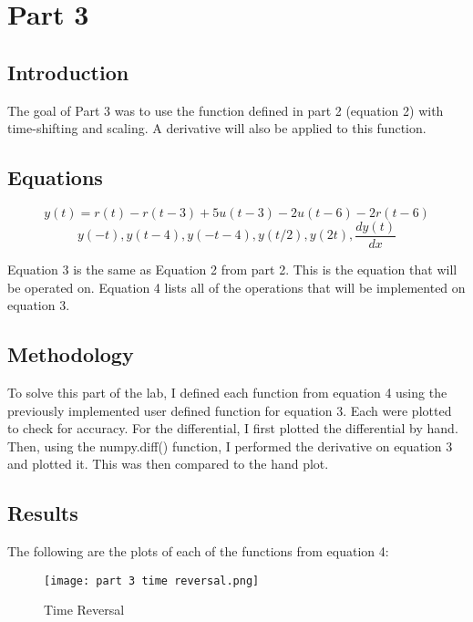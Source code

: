 \documentclass[12pt, titlepage]{article}
\begin{document}
        \section{Part 3}
            \subsection{Introduction}
            The goal of Part 3 was to use the function defined in part 2 (equation 2) with time-shifting and scaling.  A derivative will also be applied to this function.
            
            \subsection{Equations}
            \begin{equation}
                y(t)=r(t)-r(t-3)+5u(t-3)-2u(t-6)-2r(t-6)
            \end{equation}
            \begin{equation}
                y(-t), y(t-4), y(-t-4), y(t/2), y(2t), \frac{dy(t)}{dx}
            \end{equation}
            
            Equation 3 is the same as Equation 2 from part 2.  This is the equation that will be operated on.  Equation 4 lists all of the operations that will be implemented on equation 3.
            
            \subsection{Methodology}
            To solve this part of the lab, I defined each function from equation 4 using the previously implemented user defined function for equation 3.  Each were plotted to check for accuracy.  For the differential, I first plotted the differential by hand.  Then, using the numpy.diff() function, I performed the derivative on equation 3 and plotted it.  This was then compared to the hand plot.
            
            \subsection{Results}
            The following are the plots of each of the functions from equation 4:
            
            \begin{figure}[h!]
                \centering
                \texttt{[image: part 3 time reversal.png]}
                \caption{Time Reversal}
                \label{fig:my_label}
            \end{figure}
            
\end{document}
